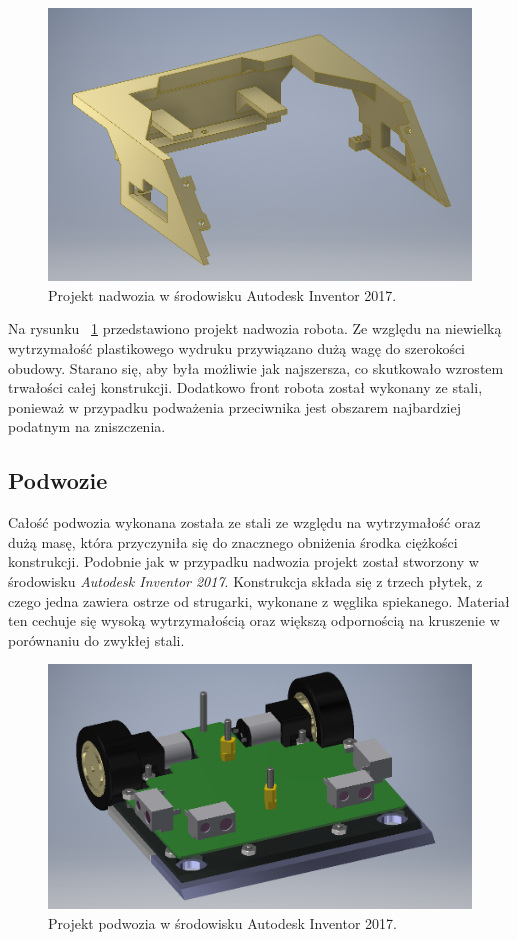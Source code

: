 \begin{figure}[H]
	\centering
		\includegraphics[width=0.75\linewidth]{pic04/body.png}
	\caption{Projekt nadwozia w środowisku Autodesk Inventor 2017.}
	\label{fig:body}	
\end{figure}

Na rysunku ~\ref{fig:body} przedstawiono projekt nadwozia robota. Ze względu na niewielką wytrzymałość plastikowego wydruku przywiązano dużą wagę do szerokości obudowy. Starano się, aby była możliwie jak najszersza, co skutkowało wzrostem trwałości całej konstrukcji. Dodatkowo front robota został wykonany ze stali, ponieważ w przypadku podważenia przeciwnika jest obszarem najbardziej podatnym na zniszczenia. 

\newpage

\subsection{Podwozie}
Całość podwozia wykonana została ze stali ze względu na wytrzymałość oraz dużą masę, która przyczyniła się do znacznego obniżenia środka ciężkości konstrukcji.  Podobnie jak w przypadku nadwozia projekt został stworzony w środowisku \textit{Autodesk Inventor 2017}. Konstrukcja składa się z trzech płytek, z czego jedna zawiera ostrze od strugarki, wykonane z węglika spiekanego. Materiał ten cechuje się wysoką wytrzymałością oraz większą odpornością na kruszenie w porównaniu do zwykłej stali. 

\begin{figure}[H]
	\centering
		\includegraphics[width=0.75\linewidth]{pic04/chassis.png}
	\caption{Projekt podwozia w środowisku Autodesk Inventor 2017.}
	\label{fig:chassis}	
\end{figure}

